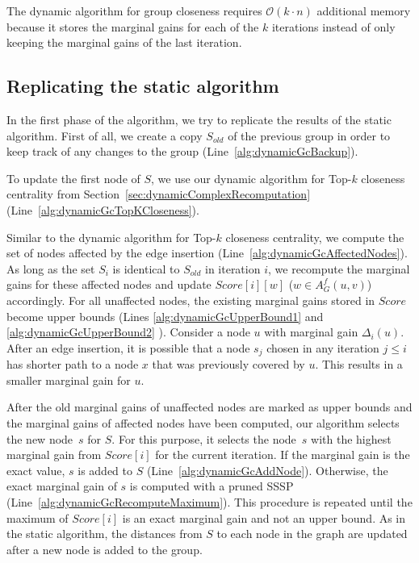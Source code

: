The dynamic algorithm for group closeness requires $\mathcal{O}(k \cdot n)$ additional memory because it stores the marginal gains for each of the $k$ iterations instead of only keeping the marginal gains of the last iteration.

\subsection{Replicating the static algorithm}
In the first phase of the algorithm, we try to replicate the results of the static algorithm. First of all, we create a copy $S_{old}$ of the previous group in order to keep track of any changes to the group (Line~\ref{alg:dynamicGcBackup}).

To update the first node of $S$, we use our dynamic algorithm for Top-$k$ closeness centrality from Section~\ref{sec:dynamicComplexRecomputation} (Line~\ref{alg:dynamicGcTopKCloseness}). 

Similar to the dynamic algorithm for Top-$k$ closeness centrality, we compute the set of nodes affected by the edge insertion (Line~\ref{alg:dynamicGcAffectedNodes}). As long as the set $S_i$ is identical to $S_{old}$ in iteration $i$, we recompute the marginal gains for these affected nodes and update $Score[i][w]$ ($w \in A_G^f(u, v)$) accordingly. For all unaffected nodes, the existing marginal gains stored in $Score$ become upper bounds (Lines \ref{alg:dynamicGcUpperBound1} and \ref{alg:dynamicGcUpperBound2} ). Consider a node $u$ with marginal gain $\Delta_i(u)$. After an edge insertion, it is possible that a node $s_j$ chosen in any iteration $j \leq i$ has shorter path to a node $x$ that was previously covered by $u$. This results in a smaller marginal gain for $u$.

After the old marginal gains of unaffected nodes are marked as upper bounds and the marginal gains of affected nodes have been computed, our algorithm selects the new node~$s$ for $S$. For this purpose, it selects the node~$s$ with the highest marginal gain from $Score[i]$ for the current iteration. If the marginal gain is the exact value, $s$ is added to $S$ (Line~\ref{alg:dynamicGcAddNode}). Otherwise, the exact marginal gain of $s$ is computed with a pruned SSSP (Line~\ref{alg:dynamicGcRecomputeMaximum}). This procedure is repeated until the maximum of $Score[i]$ is an exact marginal gain and not an upper bound. As in the static algorithm, the distances from $S$ to each node in the graph are updated after a new node is added to the group.

